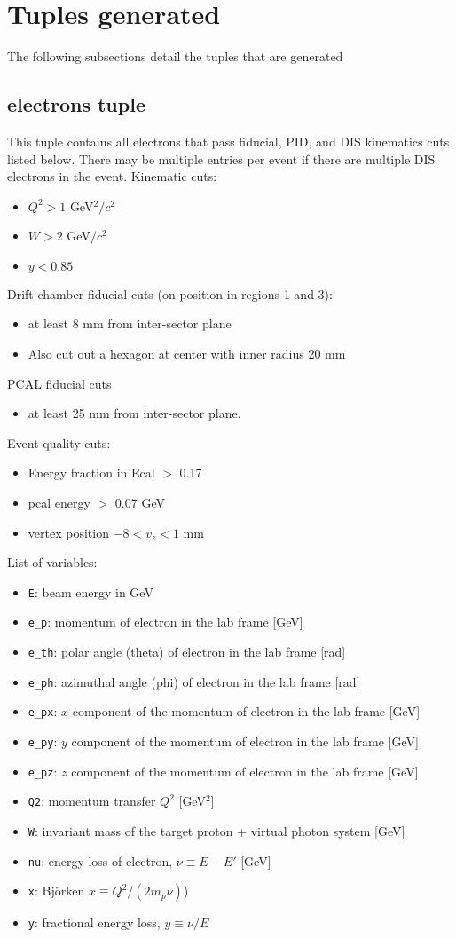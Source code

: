 \documentclass[english]{article}
\newcommand{\code}[1]{\texttt{#1}}
\begin{document}
\section{Tuples generated}
The following subsections detail the tuples that are generated
\subsection{electrons tuple}
This tuple contains all electrons that pass fiducial, PID, and DIS kinematics cuts listed below.  There may be multiple entries per event if there are multiple DIS electrons in the event.
Kinematic cuts:
\begin{itemize}
\item $Q^2>1$ GeV$^2/c^2$
\item $W>2$ GeV$/c^2$
\item $y<0.85$
\end{itemize}
Drift-chamber fiducial cuts (on position in regions 1 and 3):
\begin{itemize}
\item at least 8 mm from inter-sector plane
\item Also cut out a hexagon at center with inner radius 20 mm
\end{itemize}
PCAL fiducial cuts
\begin{itemize}
\item at least 25 mm from inter-sector plane.
\end{itemize}
Event-quality cuts:
\begin{itemize}
\item Energy fraction in Ecal $>$ 0.17
\item pcal energy $>$ 0.07 GeV
\item vertex position $-8 < v_z < 1$ mm
\end{itemize}
List of variables:
\begin{itemize}
\item \code{E}:  beam energy in GeV
\item \code{e\_p}:  momentum of electron in the lab frame [GeV]
\item \code{e\_th}:  polar angle (theta) of electron in the lab frame [rad]
\item \code{e\_ph}:  azimuthal angle (phi) of electron in the lab frame [rad]
\item \code{e\_px}: $x$ component of the momentum of electron in the lab frame [GeV]
\item \code{e\_py}: $y$ component of the momentum of electron in the lab frame [GeV]
\item \code{e\_pz}: $z$ component of the momentum of electron in the lab frame [GeV]
\item \code{Q2}:  momentum transfer $Q^2$ [GeV$^2$]
\item \code{W}:  invariant mass of the target proton + virtual photon system [GeV]
\item \code{nu}:  energy loss of electron, $\nu \equiv E-E'$ [GeV]
\item \code{x}:  Bj\" orken $x\equiv Q^2/(2m_p \nu)$)
\item \code{y}:  fractional energy loss, $y\equiv\nu/E$
\end{itemize}
\end{document}
